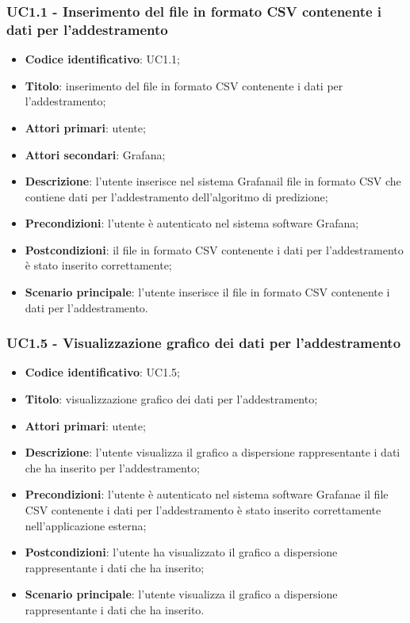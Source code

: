 \subsubsection{UC1.1 - Inserimento del file in formato CSV contenente i dati per l'addestramento}
\begin{itemize}
	\item \textbf{Codice identificativo}: UC1.1;
	\item \textbf{Titolo}: inserimento del file in formato CSV contenente i dati per l'addestramento;
	\item \textbf{Attori primari}: utente;
	\item \textbf{Attori secondari}: Grafana\glo;
	\item \textbf{Descrizione}: l'utente inserisce nel sistema Grafana\glosp il file in formato CSV che contiene dati per l'addestramento dell'algoritmo di predizione;
	\item \textbf{Precondizioni}: l'utente è autenticato nel sistema software Grafana\glo;
	\item \textbf{Postcondizioni}: il file in formato CSV contenente i dati per l'addestramento è stato inserito correttamente;
	\item \textbf{Scenario principale}: l'utente inserisce il file in formato CSV contenente i dati per l'addestramento.
\end{itemize}
\subsubsection{UC1.5 - Visualizzazione grafico dei dati per l'addestramento}
\begin{itemize}
	\item \textbf{Codice identificativo}: UC1.5;
	\item \textbf{Titolo}: visualizzazione grafico dei dati per l'addestramento;
	\item \textbf{Attori primari}: utente;
	\item \textbf{Descrizione}: l'utente visualizza il grafico a dispersione rappresentante i dati che ha inserito per l'addestramento;
	\item \textbf{Precondizioni}: l'utente è autenticato nel sistema software Grafana\glosp e il file CSV contenente i dati per l'addestramento è stato inserito correttamente nell'applicazione esterna;
	\item \textbf{Postcondizioni}: l'utente ha visualizzato il grafico a dispersione rappresentante i dati che ha inserito;
	\item \textbf{Scenario principale}: l'utente visualizza il grafico a dispersione rappresentante i dati che ha inserito.
\end{itemize}
